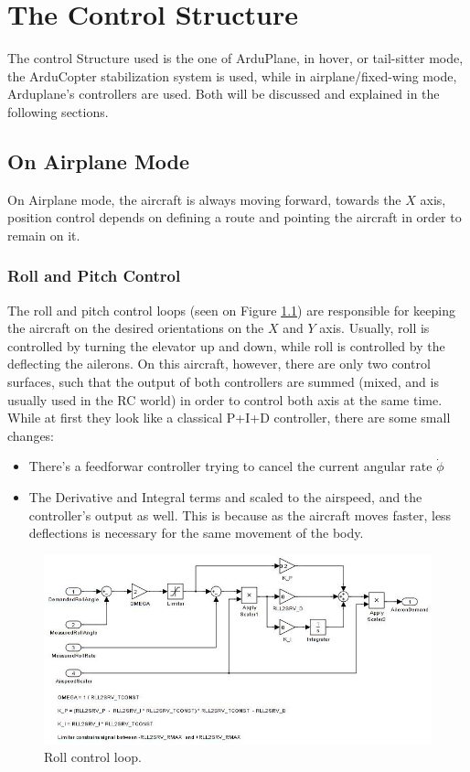 \chapter{The Control Structure} \label{chap:control}

The control Structure used is the one of ArduPlane, in hover, or tail-sitter mode, the ArduCopter stabilization system is used, while in airplane/fixed-wing mode, Arduplane's controllers are used. Both will be discussed and explained in the following sections.

\section{On Airplane Mode}

On Airplane mode, the aircraft is always moving forward, towards the $X$ axis, position control depends on defining a route and pointing the aircraft in order to remain on it.

\subsection{Roll and Pitch Control}

The roll and pitch control loops (seen on Figure \ref{fig:roll_loop}) are responsible for keeping the aircraft on the desired orientations on the $X$ and $Y$ axis. Usually, roll is controlled by turning the elevator up and down, while roll is controlled by the deflecting the ailerons. On this aircraft, however, there are only two control surfaces, such that the output of both controllers are summed (mixed, and is usually used in the RC world) in order to control both axis at the same time.
While at first they look like a classical P+I+D controller, there are some small changes:

\begin{itemize}
\item There's a feedforwar controller trying to cancel the current angular rate $\dot{\phi}$
\item The Derivative and Integral terms and scaled to the airspeed, and the controller's output as well. This is because  as the aircraft moves faster, less deflections is necessary for the same movement of the body.
\end{itemize}


\begin{figure}[H]
\centering
  \includegraphics[width=\linewidth]{figs/roll_control_loop.jpg}
  \caption{Roll control loop.}
  \label{fig:roll_loop}
\end{figure}

